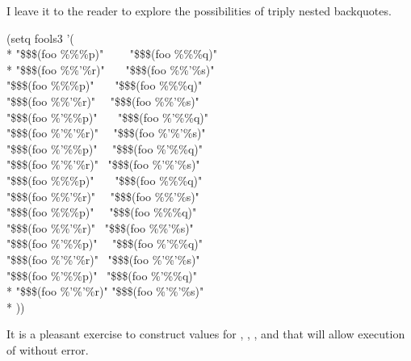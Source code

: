\begin{new}
I leave it to the reader to explore the possibilities of triply nested backquotes.
\begin{lisp}
(setq fools3 '( \\*
"\$\$\$(foo \%\%\%p)" ~~~~"\$\$\$(foo \%\%\%{\Xatsign}q)" \\*
"\$\$\$(foo \%\%'\%r)" ~~~"\$\$\$(foo \%\%'\%{\Xatsign}s)" \\
"\$\$\$(foo \%\%{\Xatsign}\%p)" ~~~"\$\$\$(foo \%\%{\Xatsign}\%{\Xatsign}q)" \\
"\$\$\$(foo \%\%{\Xatsign}'\%r)" ~~"\$\$\$(foo \%\%{\Xatsign}'\%{\Xatsign}s)" \\
"\$\$\$(foo \%'\%\%p)" ~~~"\$\$\$(foo \%'\%\%{\Xatsign}q)" \\
"\$\$\$(foo \%'\%'\%r)" ~~"\$\$\$(foo \%'\%'\%{\Xatsign}s)" \\
"\$\$\$(foo \%'\%{\Xatsign}\%p)" ~~"\$\$\$(foo \%'\%{\Xatsign}\%{\Xatsign}q)" \\
"\$\$\$(foo \%'\%{\Xatsign}'\%r)" ~"\$\$\$(foo \%'\%{\Xatsign}'\%{\Xatsign}s)" \\
"\$\$\$(foo \%{\Xatsign}\%\%p)" ~~~"\$\$\$(foo \%{\Xatsign}\%\%{\Xatsign}q)" \\
"\$\$\$(foo \%{\Xatsign}\%'\%r)" ~~"\$\$\$(foo \%{\Xatsign}\%'\%{\Xatsign}s)" \\
"\$\$\$(foo \%{\Xatsign}\%{\Xatsign}\%p)" ~~"\$\$\$(foo \%{\Xatsign}\%{\Xatsign}\%{\Xatsign}q)" \\
"\$\$\$(foo \%{\Xatsign}\%{\Xatsign}'\%r)" ~"\$\$\$(foo \%{\Xatsign}\%{\Xatsign}'\%{\Xatsign}s)" \\
"\$\$\$(foo \%{\Xatsign}'\%\%p)" ~~"\$\$\$(foo \%{\Xatsign}'\%\%{\Xatsign}q)" \\
"\$\$\$(foo \%{\Xatsign}'\%'\%r)" ~"\$\$\$(foo \%{\Xatsign}'\%'\%{\Xatsign}s)" \\
"\$\$\$(foo \%{\Xatsign}'\%{\Xatsign}\%p)" ~"\$\$\$(foo \%{\Xatsign}'\%{\Xatsign}\%{\Xatsign}q)" \\*
"\$\$\$(foo \%{\Xatsign}'\%{\Xatsign}'\%r)" "\$\$\$(foo \%{\Xatsign}'\%{\Xatsign}'\%{\Xatsign}s)" \\*
))
\end{lisp}
It is a pleasant exercise to construct values for , , , and 
that will allow execution of  without error.

\end{new}
\endgroup
